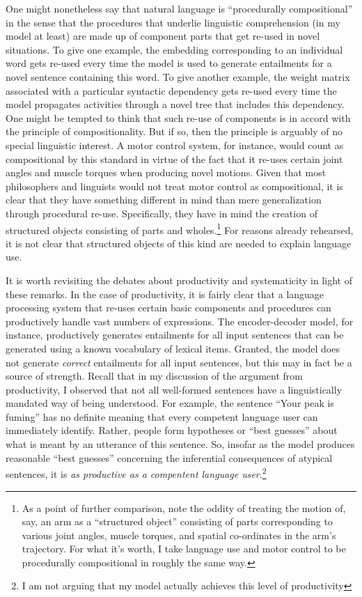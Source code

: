 One might nonetheless say that natural language is ``procedurally compositional'' in the sense that the procedures that underlie linguistic comprehension (in my model at least) are made up of component parts that get re-used in novel situations. To give one example, the embedding corresponding to an individual word gets re-used every time the model is used to generate entailments for a novel sentence containing this word. To give another example, the weight matrix associated with a particular syntactic dependency gets re-used every time the model propagates activities through a novel tree that includes this dependency. One might be tempted to think that such re-use of components is in accord with the principle of compositionality. But if so, then the principle is arguably of no special linguistic interest. A motor control system, for instance, would count as compositional by this standard in virtue of the fact that it re-uses certain joint angles and muscle torques when producing novel motions. Given that most philosophers and linguists would not treat motor control as compositional, it is clear that they have something different in mind than mere generalization through procedural re-use. Specifically, they have in mind the creation of structured objects consisting of parts and wholes.\footnote{As a point of further comparison, note the oddity of treating the motion of, say, an arm as a ``structured object'' consisting of parts corresponding to various joint angles, muscle torques, and spatial co-ordinates in the arm's trajectory. For what it's worth, I take language use and motor control to be procedurally compositional in roughly the same way.} For reasons already rehearsed, it is not clear that structured objects of this kind are needed to explain language use.

It is worth revisiting the debates about productivity and systematicity in light of these remarks. In the case of productivity, it is fairly clear that a language processing system that re-uses certain basic components and procedures can productively handle vast numbers of expressions. The encoder-decoder model, for instance, productively generates entailments for all input sentences that can be generated using a known vocabulary of lexical items. Granted, the model does not generate \textit{correct} entailments for all input sentences, but this may in fact be a source of strength. Recall that in my discussion of the argument from productivity, I observed that not all well-formed sentences have a linguistically mandated way of being understood. For example, the sentence ``Your peak is fuming'' has no definite meaning that every competent language user can immediately identify. Rather, people form hypotheses or ``best guesses'' about what is meant by an utterance of this sentence. So, insofar as the model produces reasonable ``best guesses'' concerning the inferential consequences of atypical sentences, it is \textit{as productive as a compentent language user}.\footnote{I am not arguing that my model actually achieves this level of productivity}


